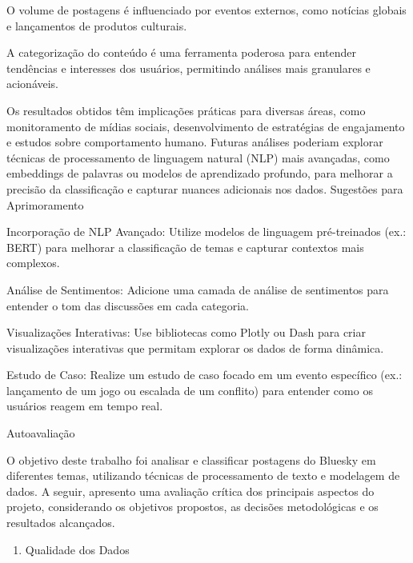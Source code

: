 \documentclass[
  letterpaper,
  DIV=11,
  numbers=noendperiod]{scrartcl}
\providecommand{\tightlist}{%
  \setlength{\itemsep}{0pt}\setlength{\parskip}{0pt}}\usepackage{longtable,booktabs,array}
\begin{document}
\begin{VerbatimWithBreaks}
O volume de postagens é influenciado por eventos externos, como notícias globais e lançamentos de produtos culturais. 

A categorização do conteúdo é uma ferramenta poderosa para entender tendências e interesses dos usuários, permitindo análises mais granulares e acionáveis. 
 
\end{VerbatimWithBreaks}

Os resultados obtidos têm implicações práticas para diversas áreas, como
monitoramento de mídias sociais, desenvolvimento de estratégias de
engajamento e estudos sobre comportamento humano. Futuras análises
poderiam explorar técnicas de processamento de linguagem natural (NLP)
mais avançadas, como embeddings de palavras ou modelos de aprendizado
profundo, para melhorar a precisão da classificação e capturar nuances
adicionais nos dados. Sugestões para Aprimoramento

\begin{VerbatimWithBreaks}
Incorporação de NLP Avançado:  Utilize modelos de linguagem pré-treinados (ex.: BERT) para melhorar a classificação de temas e capturar contextos mais complexos. 

Análise de Sentimentos:  Adicione uma camada de análise de sentimentos para entender o tom das discussões em cada categoria. 

Visualizações Interativas:  Use bibliotecas como Plotly ou Dash para criar visualizações interativas que permitam explorar os dados de forma dinâmica. 

Estudo de Caso:  Realize um estudo de caso focado em um evento específico (ex.: lançamento de um jogo ou escalada de um conflito) para entender como os usuários reagem em tempo real. 
 
\end{VerbatimWithBreaks}

Autoavaliação 

O objetivo deste trabalho foi analisar e classificar postagens do
Bluesky em diferentes temas, utilizando técnicas de processamento de
texto e modelagem de dados. A seguir, apresento uma avaliação crítica
dos principais aspectos do projeto, considerando os objetivos propostos,
as decisões metodológicas e os resultados alcançados.

\begin{enumerate}
\def\labelenumi{\arabic{enumi}.}
\tightlist
\item
  Qualidade dos Dados
\end{enumerate}
\end{document}

